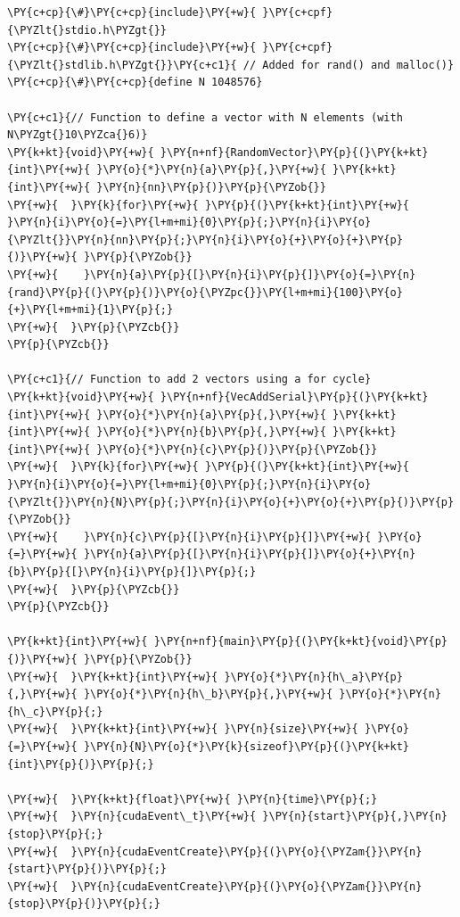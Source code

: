 \begin{Verbatim}[label=\makebox{\url{https://github.com/lucabaldini/cmepda/tree/master/slides/latex/snippets/cuda_vec_add_serial.cu}},commandchars=\\\{\}]
\PY{c+cp}{\#}\PY{c+cp}{include}\PY{+w}{ }\PY{c+cpf}{\PYZlt{}stdio.h\PYZgt{}}
\PY{c+cp}{\#}\PY{c+cp}{include}\PY{+w}{ }\PY{c+cpf}{\PYZlt{}stdlib.h\PYZgt{}}\PY{c+c1}{ // Added for rand() and malloc()}
\PY{c+cp}{\#}\PY{c+cp}{define N 1048576}

\PY{c+c1}{// Function to define a vector with N elements (with N\PYZgt{}10\PYZca{}6)}
\PY{k+kt}{void}\PY{+w}{ }\PY{n+nf}{RandomVector}\PY{p}{(}\PY{k+kt}{int}\PY{+w}{ }\PY{o}{*}\PY{n}{a}\PY{p}{,}\PY{+w}{ }\PY{k+kt}{int}\PY{+w}{ }\PY{n}{nn}\PY{p}{)}\PY{p}{\PYZob{}}
\PY{+w}{  }\PY{k}{for}\PY{+w}{ }\PY{p}{(}\PY{k+kt}{int}\PY{+w}{ }\PY{n}{i}\PY{o}{=}\PY{l+m+mi}{0}\PY{p}{;}\PY{n}{i}\PY{o}{\PYZlt{}}\PY{n}{nn}\PY{p}{;}\PY{n}{i}\PY{o}{+}\PY{o}{+}\PY{p}{)}\PY{+w}{ }\PY{p}{\PYZob{}}
\PY{+w}{    }\PY{n}{a}\PY{p}{[}\PY{n}{i}\PY{p}{]}\PY{o}{=}\PY{n}{rand}\PY{p}{(}\PY{p}{)}\PY{o}{\PYZpc{}}\PY{l+m+mi}{100}\PY{o}{+}\PY{l+m+mi}{1}\PY{p}{;}
\PY{+w}{  }\PY{p}{\PYZcb{}}
\PY{p}{\PYZcb{}}

\PY{c+c1}{// Function to add 2 vectors using a for cycle}
\PY{k+kt}{void}\PY{+w}{ }\PY{n+nf}{VecAddSerial}\PY{p}{(}\PY{k+kt}{int}\PY{+w}{ }\PY{o}{*}\PY{n}{a}\PY{p}{,}\PY{+w}{ }\PY{k+kt}{int}\PY{+w}{ }\PY{o}{*}\PY{n}{b}\PY{p}{,}\PY{+w}{ }\PY{k+kt}{int}\PY{+w}{ }\PY{o}{*}\PY{n}{c}\PY{p}{)}\PY{p}{\PYZob{}}
\PY{+w}{  }\PY{k}{for}\PY{+w}{ }\PY{p}{(}\PY{k+kt}{int}\PY{+w}{ }\PY{n}{i}\PY{o}{=}\PY{l+m+mi}{0}\PY{p}{;}\PY{n}{i}\PY{o}{\PYZlt{}}\PY{n}{N}\PY{p}{;}\PY{n}{i}\PY{o}{+}\PY{o}{+}\PY{p}{)}\PY{p}{\PYZob{}}
\PY{+w}{    }\PY{n}{c}\PY{p}{[}\PY{n}{i}\PY{p}{]}\PY{+w}{ }\PY{o}{=}\PY{+w}{ }\PY{n}{a}\PY{p}{[}\PY{n}{i}\PY{p}{]}\PY{o}{+}\PY{n}{b}\PY{p}{[}\PY{n}{i}\PY{p}{]}\PY{p}{;}
\PY{+w}{  }\PY{p}{\PYZcb{}}
\PY{p}{\PYZcb{}}

\PY{k+kt}{int}\PY{+w}{ }\PY{n+nf}{main}\PY{p}{(}\PY{k+kt}{void}\PY{p}{)}\PY{+w}{ }\PY{p}{\PYZob{}}
\PY{+w}{  }\PY{k+kt}{int}\PY{+w}{ }\PY{o}{*}\PY{n}{h\_a}\PY{p}{,}\PY{+w}{ }\PY{o}{*}\PY{n}{h\_b}\PY{p}{,}\PY{+w}{ }\PY{o}{*}\PY{n}{h\_c}\PY{p}{;}
\PY{+w}{  }\PY{k+kt}{int}\PY{+w}{ }\PY{n}{size}\PY{+w}{ }\PY{o}{=}\PY{+w}{ }\PY{n}{N}\PY{o}{*}\PY{k}{sizeof}\PY{p}{(}\PY{k+kt}{int}\PY{p}{)}\PY{p}{;}

\PY{+w}{  }\PY{k+kt}{float}\PY{+w}{ }\PY{n}{time}\PY{p}{;}
\PY{+w}{  }\PY{n}{cudaEvent\_t}\PY{+w}{ }\PY{n}{start}\PY{p}{,}\PY{n}{stop}\PY{p}{;}
\PY{+w}{  }\PY{n}{cudaEventCreate}\PY{p}{(}\PY{o}{\PYZam{}}\PY{n}{start}\PY{p}{)}\PY{p}{;}
\PY{+w}{  }\PY{n}{cudaEventCreate}\PY{p}{(}\PY{o}{\PYZam{}}\PY{n}{stop}\PY{p}{)}\PY{p}{;}


\end{Verbatim}
